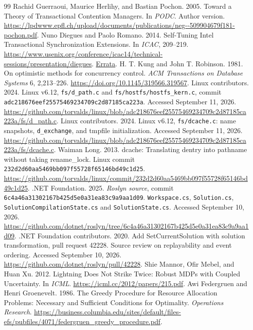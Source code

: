 \documentclass[acmsmall,screen,review,anonymous]{acmart}
\begin{document}
\begin{thebibliography}{99}
 Rachid Guerraoui, Maurice Herlihy, and Bastian Pochon. 2005. Toward a Theory of Transactional Contention Managers. In \emph{PODC}. Author version. \url{https://lpdwww.epfl.ch/upload/documents/publications/neg--509904679f181-pochon.pdf}.
 Nuno Diegues and Paolo Romano. 2014. Self-Tuning Intel Transactional Synchronization Extensions. In \emph{ICAC}, 209--219. \url{https://www.usenix.org/conference/icac14/technical-sessions/presentation/diegues}. \href{https://www.usenix.org/system/files/conference/icac14/icac14-errata-diegues.pdf}{Errata}.
 H. T. Kung and John T. Robinson. 1981. On optimistic methods for concurrency control. \emph{ACM Transactions on Database Systems} 6, 2,213--226. \url{https://doi.org/10.1145/319566.319567}.
 Linux contributors. 2024. Linux v6.12, \texttt{fs/d\_path.c} and \texttt{fs/hostfs/hostfs\_kern.c}, commit \texttt{adc218676eef25575469234709c2d87185ca223a}. Accessed September 11, 2026. \url{https://github.com/torvalds/linux/blob/adc218676eef25575469234709c2d87185ca223a/fs/d_path.c}.
 Linux contributors. 2024. Linux v6.12, \texttt{fs/dcache.c}: name snapshots, \texttt{d\_exchange}, and tmpfile initialization. Accessed September 11, 2026. \url{https://github.com/torvalds/linux/blob/adc218676eef25575469234709c2d87185ca223a/fs/dcache.c}.
 Waiman Long. 2013. dcache: Translating dentry into pathname without taking rename\_lock. Linux commit \texttt{232d2d60aa5469bb097f55728f65146bd49c1d25}. \url{https://github.com/torvalds/linux/commit/232d2d60aa5469bb097f55728f65146bd49c1d25}.
 .NET Foundation. 2025. \emph{Roslyn source}, commit \texttt{6c4a46a31302167b425d5e0a31ea83c9a9aa1d09}. \texttt{Workspace.cs}, \texttt{Solution.cs}, \texttt{SolutionCompilationState.cs} and \texttt{SolutionState.cs}. Accessed September 10, 2026. \url{https://github.com/dotnet/roslyn/tree/6c4a46a31302167b425d5e0a31ea83c9a9aa1d09}.
 .NET Foundation contributors. 2020. Add SetCurrentSolution with solution transformation, pull request 42228. Source review on replayability and event ordering. Accessed September 10, 2026. \url{https://github.com/dotnet/roslyn/pull/42228}.
 Shie Mannor, Ofir Mebel, and Huan Xu. 2012. Lightning Does Not Strike Twice: Robust MDPs with Coupled Uncertainty. In \emph{ICML}. \url{https://icml.cc/2012/papers/215.pdf}.
 Awi Federgruen and Henri Groenevelt. 1986. The Greedy Procedure for Resource Allocation Problems: Necessary and Sufficient Conditions for Optimality. \emph{Operations Research}. \url{https://business.columbia.edu/sites/default/files-efs/pubfiles/4071/federgruen_greedy_procedure.pdf}.

\end{thebibliography}
\end{document}
